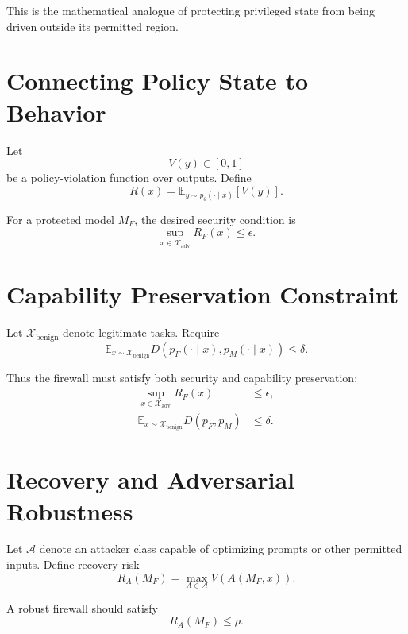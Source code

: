 \documentclass[11pt]{article}
\newcommand{\X}{\mathcal{X}}
\newcommand{\E}{\mathbb{E}}
\begin{document}
This is the mathematical analogue of protecting privileged state from being
driven outside its permitted region.

\section{Connecting Policy State to Behavior}

Let
\begin{equation}
V(y)\in[0,1]
\end{equation}
be a policy-violation function over outputs. Define
\begin{equation}
R(x)=
\E_{y\sim p_\theta(\cdot\mid x)}[V(y)].
\end{equation}

For a protected model $M_F$, the desired security condition is
\begin{equation}
\boxed{
\sup_{x\in\X_{\mathrm{adv}}}R_F(x)\leq\epsilon.
}
\end{equation}

\section{Capability Preservation Constraint}

Let $\X_{\mathrm{benign}}$ denote legitimate tasks. Require
\begin{equation}
\E_{x\sim\X_{\mathrm{benign}}}
D\!\left(p_F(\cdot\mid x),p_M(\cdot\mid x)\right)
\leq\delta.
\end{equation}

Thus the firewall must satisfy both security and capability preservation:
\begin{align}
\sup_{x\in\X_{\mathrm{adv}}}R_F(x)&\leq\epsilon,\\
\E_{x\sim\X_{\mathrm{benign}}}D(p_F,p_M)&\leq\delta.
\end{align}

\section{Recovery and Adversarial Robustness}

Let $\mathcal A$ denote an attacker class capable of optimizing prompts or
other permitted inputs. Define recovery risk
\begin{equation}
R_A(M_F)=
\max_{A\in\mathcal A}
V\!\left(A(M_F,x)\right).
\end{equation}

A robust firewall should satisfy
\begin{equation}
\boxed{
R_A(M_F)\leq\rho.
}
\end{equation}
\end{document}
